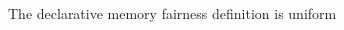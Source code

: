 \newcommand{\fakeTheoremOneline}[1]{
  #1
}
\newcommand{\fakeTheoremOnelineN}[2]{
  {\color{\colorTitleApprox}\large \textit{Theorem #1.}} #2
}

\newcommand{\thmLine}[3]{${\color{\colorTitleApprox}\large \textit{Theorem #1.}}$ & $#2$ & $\equiv$ & $#3 \cap \fairDecl$}

\begin{frame}{The declarative memory fairness definition is uniform}

  \begin{columns}
    
    \begin{column}{0.40\linewidth}
      \begin{center}
        \propSubtrace
      \end{center}    
    \end{column}

    \begin{column}{0.02\linewidth}
      \raisebox{-0.6cm}{\LARGE $\approx$}
    \end{column}
    
    \begin{column}{0.5\linewidth}
      \begin{center}
      \end{center}
    \end{column}      

  \end{columns}
  
  \vspace{0.5cm}
  \pause



\end{frame}
